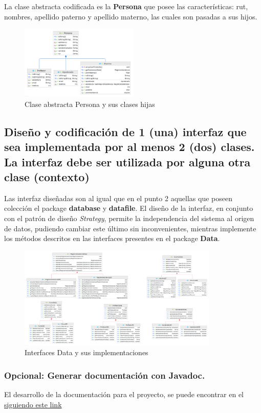 La clase abstracta codificada es la \textbf{Persona} que posee las características: rut, nombres, apellido paterno y apellido materno, las cuales son pasadas a sus hijos.

\begin{figure}[h]
    \centering
    \includegraphics[width=0.5\textwidth]{contents/img/img10}
    \caption{Clase abstracta Persona y sus clases hijas}
    \label{fig:img10}
\end{figure}

\clearpage

\subsection{Diseño y codificación de 1 (una) interfaz que sea implementada por al menos 2 (dos) clases. La interfaz debe ser utilizada por alguna otra clase (contexto)}

Las interfaz diseñadas son al igual que en el punto 2 aquellas que poseen colección el package \textbf{database} y \textbf{datafile}. El diseño de la interfaz, en conjunto con el patrón de diseño \textit{Strategy}, permite la independencia del sistema al origen de datos, pudiendo cambiar este último sin inconvenientes, mientras implemente los métodos descritos en las interfaces presentes en el package \textbf{Data}.

\begin{figure}[h]
    \centering
    \includegraphics[width=0.85\textwidth]{contents/img/img11}
    \caption{Interfaces Data y sus implementaciones}
    \label{fig:img11}
\end{figure}

\subsubsection*{Opcional: Generar documentación con Javadoc.}

El desarrollo de la documentación para el proyecto, se puede encontrar en el {\color{MyGreen}\hyperref[subsubsec:codydoc]{siguiendo este link}}
